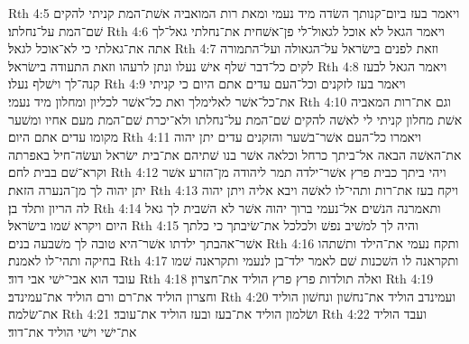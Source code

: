 Rth 4:5  ויאמר בעז ביום־קנותך השׂדה מיד נעמי ומאת רות המואביה אשׁת־המת קניתי להקים שׁם־המת על־נחלתו׃
Rth 4:6  ויאמר הגאל לא אוכל לגאול־לי פן־אשׁחית את־נחלתי גאל־לך אתה את־גאלתי כי לא־אוכל לגאל׃
Rth 4:7  וזאת לפנים בישׂראל על־הגאולה ועל־התמורה לקים כל־דבר שׁלף אישׁ נעלו ונתן לרעהו וזאת התעודה בישׂראל׃
Rth 4:8  ויאמר הגאל לבעז קנה־לך וישׁלף נעלו׃
Rth 4:9  ויאמר בעז לזקנים וכל־העם עדים אתם היום כי קניתי את־כל־אשׁר לאלימלך ואת כל־אשׁר לכליון ומחלון מיד נעמי׃
Rth 4:10  וגם את־רות המאביה אשׁת מחלון קניתי לי לאשׁה להקים שׁם־המת על־נחלתו ולא־יכרת שׁם־המת מעם אחיו ומשׁער מקומו עדים אתם היום׃
Rth 4:11  ויאמרו כל־העם אשׁר־בשׁער והזקנים עדים יתן יהוה את־האשׁה הבאה אל־ביתך כרחל וכלאה אשׁר בנו שׁתיהם את־בית ישׂראל ועשׂה־חיל באפרתה וקרא־שׁם בבית לחם׃
Rth 4:12  ויהי ביתך כבית פרץ אשׁר־ילדה תמר ליהודה מן־הזרע אשׁר יתן יהוה לך מן־הנערה הזאת׃
Rth 4:13  ויקח בעז את־רות ותהי־לו לאשׁה ויבא אליה ויתן יהוה לה הריון ותלד בן׃
Rth 4:14  ותאמרנה הנשׁים אל־נעמי ברוך יהוה אשׁר לא השׁבית לך גאל היום ויקרא שׁמו בישׂראל׃
Rth 4:15  והיה לך למשׁיב נפשׁ ולכלכל את־שׂיבתך כי כלתך אשׁר־אהבתך ילדתו אשׁר־היא טובה לך משׁבעה בנים׃
Rth 4:16  ותקח נעמי את־הילד ותשׁתהו בחיקה ותהי־לו לאמנת׃
Rth 4:17  ותקראנה לו השׁכנות שׁם לאמר ילד־בן לנעמי ותקראנה שׁמו עובד הוא אבי־ישׁי אבי דוד׃
Rth 4:18  ואלה תולדות פרץ פרץ הוליד את־חצרון׃
Rth 4:19  וחצרון הוליד את־רם ורם הוליד את־עמינדב׃
Rth 4:20  ועמינדב הוליד את־נחשׁון ונחשׁון הוליד את־שׂלמה׃
Rth 4:21  ושׂלמון הוליד את־בעז ובעז הוליד את־עובד׃
Rth 4:22  ועבד הוליד את־ישׁי וישׁי הוליד את־דוד׃


